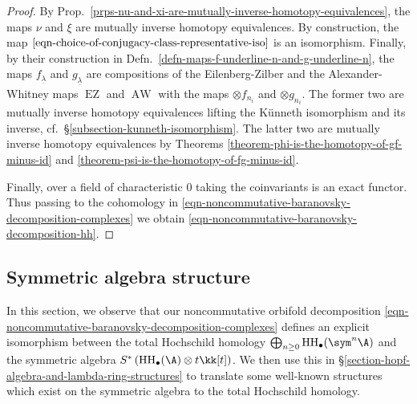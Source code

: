 \documentclass[12pt,a4paper,reqno]{amsart}
\DeclareMathOperator{\hochhom}{{HH}}
\DeclareMathOperator\ezmap{{EZ}}
\DeclareMathOperator\awmap{{AW}}
\begin{document}
\begin{proof}
By Prop.~\ref{prps-nu-and-xi-are-mutually-inverse-homotopy-equivalences},
the maps $\nu$ and $\xi$ are mutually inverse homotopy equivalences.
By construction, the 
map $\eqref{eqn-choice-of-conjugacy-class-representative-iso}$ is an
isomorphism. Finally, by their construction in 
Defn.~\ref{defn-maps-f-underline-n-and-g-underline-n}, 
the maps $f_{\underline{\lambda}}$ and $g_{\underline{\lambda}}$ are 
compositions of the Eilenberg-Zilber and the
Alexander-Whitney maps $\ezmap$ and $\awmap$ with the maps 
$\otimes f_{n_i}$ and $\otimes g_{n_i}$. The former two are
mutually inverse homotopy equivalences lifting the K{\"u}nneth
isomorphism and its inverse, cf.~\S\ref{subsection-kunneth-isomorphism}.
The latter two are mutually inverse homotopy equivalences by Theorems
\ref{theorem-phi-is-the-homotopy-of-gf-minus-id} and 
\ref{theorem-psi-is-the-homotopy-of-fg-minus-id}. 

Finally, over a field of characteristic $0$ taking the coinvariants is an
exact functor. Thus passing to the cohomology in
\eqref{eqn-noncommutative-baranovsky-decomposition-complexes}
we obtain
\eqref{eqn-noncommutative-baranovsky-decomposition-hh}. 
\end{proof}

\subsection{Symmetric algebra structure}

In this section, we observe that our noncommutative orbifold decomposition 
\eqref{eqn-noncommutative-baranovsky-decomposition-complexes} defines
an explicit isomorphism between the total Hochschild homology 
$\bigoplus_{n \geq 0} \hochhom_\bullet(\sym^n \A)$ and the
symmetric algebra $S^* \left( \hochhom_\bullet(\A) \otimes t
\kk[t] \right)$. We then use this in 
\S\ref{section-hopf-algebra-and-lambda-ring-structures} to translate 
some well-known structures which exist on the symmetric algebra to 
the total Hochschild homology. 
\end{document}
